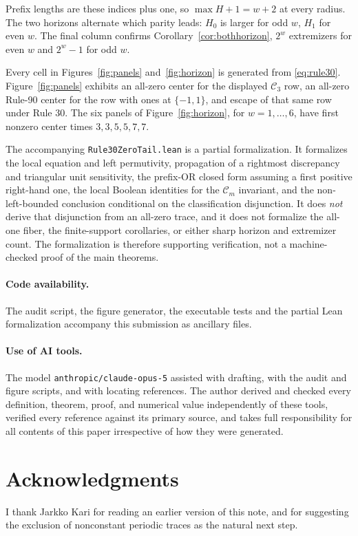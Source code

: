 \documentclass[11pt]{article}
\begin{document}
Prefix lengths are these indices plus one, so $\max H+1=w+2$ at every radius.
The two horizons alternate which parity leads: $H_0$ is larger for odd $w$,
$H_1$ for even $w$.  The final column confirms
Corollary~\ref{cor:bothhorizon}, $2^w$ extremizers for even $w$ and $2^w-1$ for
odd $w$.

Every cell in Figures~\ref{fig:panels} and~\ref{fig:horizon} is generated from
\eqref{eq:rule30}.  Figure~\ref{fig:panels} exhibits an all-zero center for the
displayed $\mathcal C_3$ row, an all-zero Rule-90 center for the row with ones
at $\{-1,1\}$, and escape of that same row under Rule 30.  The six panels of
Figure~\ref{fig:horizon}, for $w=1,\ldots,6$, have first nonzero center times
$3,3,5,5,7,7$.

The accompanying \texttt{Rule30ZeroTail.lean} is a partial formalization.  It
formalizes the local equation and left permutivity, propagation of a rightmost
discrepancy and triangular unit sensitivity, the prefix-OR closed form assuming
a first positive right-hand one, the local Boolean identities for the
$\mathcal C_m$ invariant, and the non-left-bounded conclusion conditional on
the classification disjunction.  It does \emph{not} derive that disjunction from
an all-zero trace, and it does not formalize the all-one fiber, the finite-support
corollaries, or either sharp horizon and extremizer count.  The formalization is
therefore supporting verification, not a machine-checked proof of the main
theorems.

\paragraph{Code availability.}
The audit script, the figure generator, the executable tests and the partial
Lean formalization accompany this submission as ancillary files.

\paragraph{Use of AI tools.}
The model \texttt{anthropic/claude-opus-5} assisted with drafting, with the audit
and figure scripts, and with locating references.  The author derived and
checked every definition, theorem, proof, and numerical value independently of
these tools, verified every reference against its primary source, and takes full
responsibility for all contents of this paper irrespective of how they were
generated.

\section*{Acknowledgments}
I thank Jarkko Kari for reading an earlier version of this note, and for
suggesting the exclusion of nonconstant periodic traces as the natural next
step.
\end{document}
